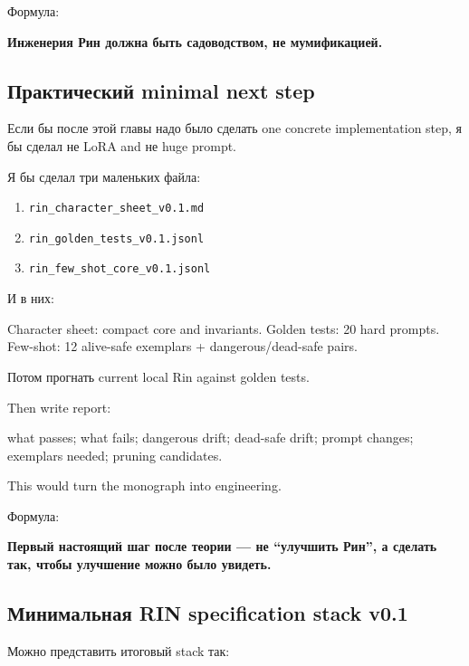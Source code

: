 Формула:

\textbf{Инженерия Рин должна быть садоводством, не мумификацией.}

\subsection*{Практический minimal next step}

Если бы после этой главы надо было сделать one concrete implementation
step, я бы сделал не LoRA and не huge prompt.

Я бы сделал три маленьких файла:

\begin{enumerate}
\def\labelenumi{\arabic{enumi}.}
\tightlist
\item
  \texttt{rin\_character\_sheet\_v0.1.md}
\item
  \texttt{rin\_golden\_tests\_v0.1.jsonl}
\item
  \texttt{rin\_few\_shot\_core\_v0.1.jsonl}
\end{enumerate}

И в них:

Character sheet: compact core and invariants. Golden tests: 20 hard
prompts. Few-shot: 12 alive-safe exemplars + dangerous/\hspace{0pt}dead-safe pairs.

Потом прогнать current local Rin against golden tests.

Then write report:

what passes; what fails; dangerous drift; dead-safe drift; prompt
changes; exemplars needed; pruning candidates.

This would turn the monograph into engineering.

Формула:

\textbf{Первый настоящий шаг после теории --- не ``улучшить Рин'', а
сделать так, чтобы улучшение можно было увидеть.}

\subsection*{Минимальная RIN specification stack v0.1}

Можно представить итоговый stack так:

